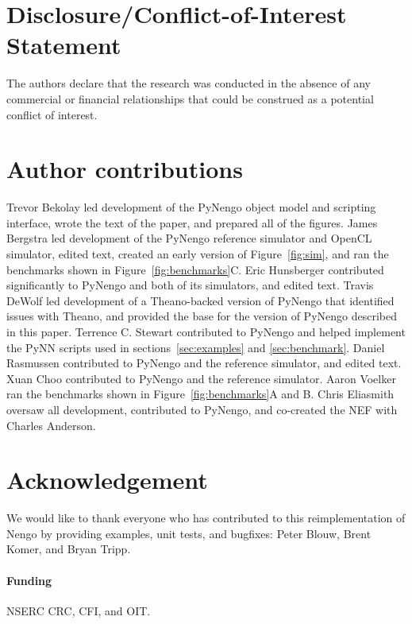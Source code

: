 \documentclass{frontiersSCNS}
\begin{document}
\section*{Disclosure/Conflict-of-Interest Statement}

The authors declare that the research was conducted in the absence of
any commercial or financial relationships that could be construed as a
potential conflict of interest.

\section*{Author contributions}

Trevor Bekolay led development of the
PyNengo object model and scripting interface,
wrote the text of the paper,
and prepared all of the figures.
James Bergstra led development of
the PyNengo reference simulator and OpenCL simulator,
edited text, created an early version
of Figure~\ref{fig:sim},
and ran the benchmarks shown in
Figure~\ref{fig:benchmarks}C.
Eric Hunsberger contributed significantly
to PyNengo and both of its simulators, and edited text.
Travis DeWolf led development
of a Theano-backed
version of PyNengo that
identified issues with Theano,
and provided the base for
the version of PyNengo described in this paper.
Terrence C. Stewart contributed
to PyNengo and helped implement
the PyNN scripts used in
sections~\ref{sec:examples} and \ref{sec:benchmark}.
Daniel Rasmussen contributed
to PyNengo and the reference simulator,
and edited text.
Xuan Choo contributed to PyNengo
and the reference simulator.
Aaron Voelker ran the benchmarks
shown in Figure~\ref{fig:benchmarks}A and B.
Chris Eliasmith oversaw all development,
contributed to PyNengo,
and co-created the NEF with Charles Anderson.

\section*{Acknowledgement}

We would like to thank
everyone who has contributed
to this reimplementation of Nengo
by providing examples,
unit tests, and bugfixes:
Peter Blouw, Brent Komer, and Bryan Tripp.


\paragraph{Funding\textcolon}
NSERC CRC, CFI, and OIT.



\end{document}
